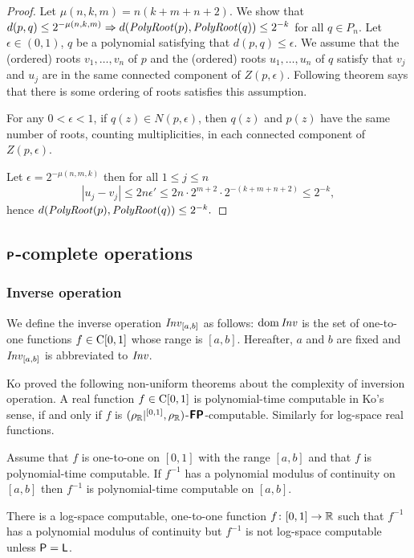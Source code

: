 \documentclass[envcountsame,orivec,oribibl]{llncs}
\begin{document}
\begin{proof}
Let $\mu(n, k, m) = n(k+m+n+2)$.
We show that 
$
d(p, q) \le 2^{-\mu(n, k, m)} \Rightarrow d(\mathit{PolyRoot}(p), \mathit{PolyRoot}(q)) \le 2^{-k}
$
for all $q \in P_n$.
Let $\epsilon \in (0,1)$, $q$ be a polynomial satisfying that
 $d(p, q) \le \epsilon$.
We assume that the (ordered) roots $v_1, \dots, v_n$ of $p$
and the (ordered) roots $u_1, \dots, u_n$ of $q$ satisfy that
$v_j$ and $u_j$ are in the same connected component of $Z(p, \epsilon)$.
Following theorem says that there is some ordering of roots satisfies this assumption.
\begin{theorem}
\label{theorem: root neighborhoods 2}
 For any $0 < \epsilon < 1$, if $q(z) \in N(p, \epsilon)$,
 then $q(z)$ and $p(z)$ have the same number of roots,
 counting multiplicities, in each connected component of $Z(p, \epsilon)$.
\end{theorem}
Let $\epsilon = 2^{-\mu(n,m,k)}$ then for all $1 \le j \le n$
\begin{equation}
 |u_j - v_j| 
 \le
 2n\epsilon'
 \le
 2n \cdot 2^{m+2} \cdot 2^{-(k+m+n+2)} 
 \le
 2^{-k},
\end{equation}
hence
$
 d(\mathit{PolyRoot}(p), \mathit{PolyRoot}(q)) \le 2^{-k}.
$
\end{proof}

\subsection{$\text{\bfseries \sffamily \upshape P}$-complete operations}
\label{section:P-complete}

\subsubsection{Inverse operation}

We define the inverse operation $\mathit{Inv}_{[a,b]}$ as follows:
$\mathop{\rm dom} \mathit{Inv}$ is the set of one-to-one functions $f \in \mathrm C[0,1]$
whose range is $[a,b]$.
Hereafter, $a$ and $b$ are fixed and $\mathit{Inv}_{[a,b]}$ is abbreviated to $\mathit{Inv}$.

Ko proved the following non-uniform theorems about the complexity of 
inversion operation.
A real function $f \in \mathrm C[0,1]$ is polynomial-time computable in Ko's sense,
if and only if $f$ is $(\rho _\mathbb R|^{[0,1]}, \rho _\mathbb R)$-$\text{\bfseries \sffamily \upshape FP}$-computable. 
Similarly for log-space real functions.

\begin{theorem}
\label{theorem:ko1991-4.7}
Assume that $f$ is one-to-one on $[0,1]$ with the range $[a, b]$ and that 
$f$ is polynomial-time computable. 
If $f^{-1}$ has a polynomial modulus of continuity on $[a,b]$ then
$f^{-1}$ is polynomial-time computable on $[a, b]$.
\end{theorem}
\begin{theorem}
\label{theorem:ko1991-4.18}
There is a log-space computable, one-to-one function $f \colon [0, 1] \to \mathbb R$
such that $f^{-1}$ has a polynomial modulus of continuity
but $f^{-1}$ is not log-space computable
unless $\mathsf{P} = \mathsf{L}$.
\end{theorem}
\end{document}
